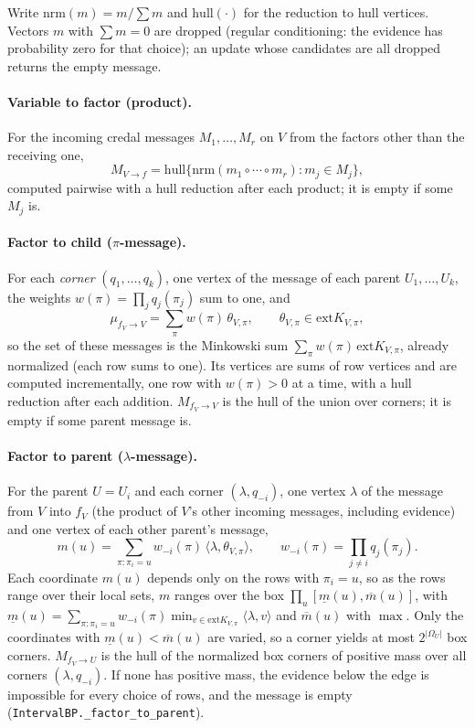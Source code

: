 \documentclass{article} %
\newcommand{\ext}{\mathrm{ext}}
\begin{document}
Write $\mathrm{nrm}(m)=m/\sum m$ and $\mathrm{hull}(\cdot)$ for the reduction to
hull vertices. Vectors $m$ with $\sum m=0$ are dropped (regular conditioning: the
evidence has probability zero for that choice); an update whose candidates are all dropped
returns the empty message.

\paragraph{Variable to factor (product).}
For the incoming credal messages $M_1,\dots,M_r$ on $V$ from the factors other than
the receiving one,
\[
  M_{V\to f}=\mathrm{hull}\bigl\{\mathrm{nrm}(m_1\circ\cdots\circ m_r) :
  m_j\in M_j\bigr\},
\]
computed pairwise with a hull reduction after each product; it is empty if some $M_j$ is.

\paragraph{Factor to child ($\pi$-message).}
For each \emph{corner} $(q_1,\dots,q_k)$, one vertex of the message of each parent
$U_1,\dots,U_k$, the weights $w(\pi)=\prod_j q_j(\pi_j)$ sum to one, and
\[
  \mu_{f_V\to V}=\sum_{\pi} w(\pi)\,\theta_{V,\pi},\qquad \theta_{V,\pi}\in\ext K_{V,\pi},
\]
so the set of these messages is the Minkowski sum
$\sum_\pi w(\pi)\,\ext K_{V,\pi}$, already normalized (each row sums to one). Its
vertices are sums of row vertices and are computed incrementally, one row with $w(\pi)>0$
at a time, with a hull reduction after each addition. $M_{f_V\to V}$ is the hull of the
union over corners; it is empty if some parent message is.

\paragraph{Factor to parent ($\lambda$-message).}
For the parent $U=U_i$ and each corner $(\lambda,q_{-i})$, one vertex $\lambda$ of
the message from $V$ into $f_V$ (the product of $V$'s other incoming messages,
including evidence) and one vertex of each other parent's message,
\[
  m(u)=\sum_{\pi:\pi_i=u} w_{-i}(\pi)\,\langle\lambda,\theta_{V,\pi}\rangle,
  \qquad w_{-i}(\pi)=\prod_{j\neq i}q_j(\pi_j).
\]
Each coordinate $m(u)$ depends only on the rows with $\pi_i=u$, so as the rows range
over their local sets, $m$ ranges over the box
$\prod_u[\underline m(u),\overline m(u)]$, with
$\underline m(u)=\sum_{\pi:\pi_i=u}w_{-i}(\pi)\min_{v\in\ext K_{V,\pi}}\langle\lambda,v\rangle$
and $\overline m(u)$ with $\max$. Only the coordinates with $\underline m(u)<\overline m(u)$
are varied, so a corner yields at most $2^{|\Omega_U|}$ box corners. $M_{f_V\to U}$ is the
hull of the normalized box corners of positive mass over all corners $(\lambda,q_{-i})$. If
none has positive mass, the evidence below the edge is impossible for every choice of rows,
and the message is empty (\texttt{IntervalBP.\_factor\_to\_parent}).
\end{document}
